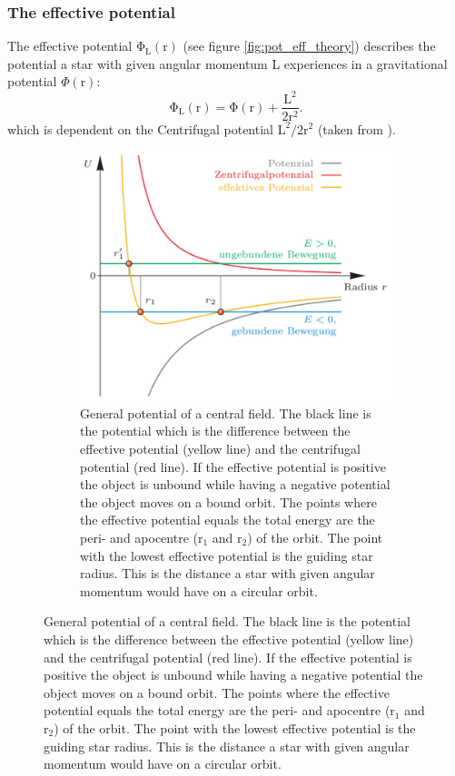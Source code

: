 \subsubsection{The effective potential}\label{sec:pot_eff}
The effective potential \(\mathrm{\Phi_{L}(r)}\) (see figure \ref{fig:pot_eff_theory}) describes the potential a star with given angular momentum L experiences in a gravitational potential  \(\Phi(\mathrm{r})\):
\begin{equation}\label{eq:eff_pot}
\mathrm{\Phi_L(r)=\Phi(r)+\frac{L^2}{2r^2}}.
\end{equation} 
which is dependent on the Centrifugal potential \(\mathrm{L^2/2r^2}\) (taken from \citet[p. 59, eq. 6.27]{bartelmann}). 
\begin{figure}[htbp]
\centering
	\begin{subfigure}{0.475\textwidth}
	\includegraphics[width=\textwidth]{Plots/eff_potential_bartelmann.png}
	\caption{General potential of a central field. The black line is the potential which is the difference between the effective potential (yellow line) and the centrifugal potential (red line). If the effective potential is positive the object is unbound while having a negative potential the object moves on a bound orbit. The points where the effective potential equals the total energy are the peri- and apocentre (r\(_1\) and r\(_2\)) of the orbit. The point with the lowest effective potential is the guiding star radius. This is the distance a star with given angular momentum would have on a circular orbit. \citep[p. 59]{bartelmann}}
	\label{fig:eff_potential_bartelmann}

\end{subfigure}
\end{figure}
